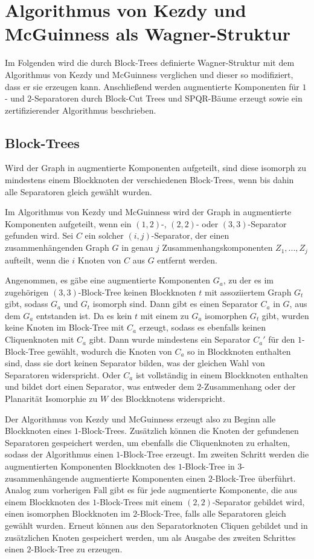 \section{Algorithmus von Kezdy und McGuinness als Wagner-Struktur}
Im Folgenden wird die durch Block-Trees definierte Wagner-Struktur mit dem Algorithmus von Kezdy und McGuinness verglichen und dieser so modifiziert, dass er sie erzeugen kann.
Anschließend werden augmentierte Komponenten für $1$- und $2$-Separatoren durch Block-Cut Trees und SPQR-Bäume erzeugt sowie ein zertifizierender Algorithmus beschrieben.

\subsection{Block-Trees}
\begin{beobachtung}
  Wird der Graph in augmentierte Komponenten aufgeteilt, sind diese isomorph zu mindestens einem Blockknoten der verschiedenen Block-Trees, wenn bis dahin alle Separatoren gleich gewählt wurden.
\end{beobachtung}
Im Algorithmus von Kezdy und McGuinness wird der Graph in augmentierte Komponenten aufgeteilt, wenn ein $(1, 2)$-, $(2, 2)$- oder $(3, 3)$-Separator gefunden wird.
Sei $C$ ein solcher $(i, j)$-Separator, der einen zusammenhängenden Graph $G$ in genau $j$ Zusammenhangskomponenten $Z_1, ..., Z_j$ aufteilt, wenn die $i$ Knoten von $C$ aus $G$ entfernt werden.

Angenommen, es gäbe eine augmentierte Komponenten $G_a$, zu der es im zugehörigen $(3, 3)$-Block-Tree keinen Blockknoten $t$ mit assoziiertem Graph $G_t$ gibt, sodass $G_a$ und $G_t$ isomorph sind.
Dann gibt es einen Separator $C_a$ in $G$, aus dem $G_a$ entstanden ist.
Da es kein $t$ mit einem zu $G_a$ isomorphen $G_t$ gibt, wurden keine Knoten im Block-Tree mit $C_a$ erzeugt, sodass es ebenfalls keinen Cliquenknoten mit $C_a$ gibt.
Dann wurde mindestens ein Separator $C_a'$ für den $1$-Block-Tree gewählt, wodurch die Knoten von $C_a$ so in Blockknoten enthalten sind, dass sie dort keinen Separator bilden, was der gleichen Wahl von Separatoren widerspricht.
Oder $C_a$ ist vollständig in einem Blockknoten enthalten und bildet dort einen Separator, was entweder dem $2$-Zusammenhang oder der Planarität \bzw Isomorphie zu $W$ des Blockknotens widerspricht.

Der Algorithmus von Kezdy und McGuinness erzeugt also zu Beginn alle Blockknoten eines $1$-Block-Trees.
Zusätzlich können die Knoten der gefundenen Separatoren gespeichert werden, um ebenfalls die Cliquenknoten zu erhalten, sodass der Algorithmus einen $1$-Block-Tree erzeugt.
Im zweiten Schritt werden die augmentierten Komponenten \bzw Blockknoten des $1$-Block-Tree in $3$-zusammenhängende augmentierte Komponenten \bzw einen $2$-Block-Tree überführt.
Analog zum vorherigen Fall gibt es für jede augmentierte Komponente, die aus einem Blockknoten des $1$-Block-Trees mit einem $(2, 2)$-Separator gebildet wird, einen isomorphen Blockknoten im $2$-Block-Tree, falls alle Separatoren gleich gewählt wurden.
Erneut können aus den Separatorknoten Cliquen gebildet und in zusätzlichen Knoten gespeichert werden, um als Ausgabe des zweiten Schrittes einen $2$-Block-Tree zu erzeugen.

